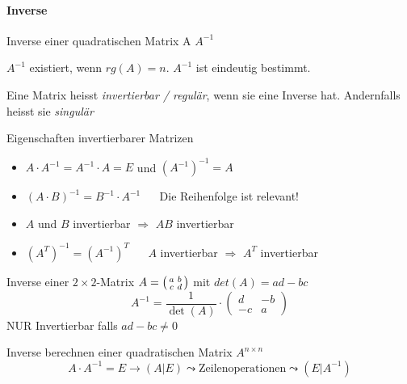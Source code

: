 \paragraph{Inverse}
    \begin{definition}{Inverse einer quadratischen Matrix A} $A^{-1}$ 
        
        $A^{-1}$ existiert, wenn $rg(A) = n$. $A^{-1}$ ist eindeutig bestimmt.

        \vspace{1mm}

        {\small Eine Matrix heisst \textit{invertierbar / regulär}, wenn sie eine Inverse hat. 
        Andernfalls heisst sie \textit{singulär}}
    \end{definition}
  
    \begin{theorem}{Eigenschaften invertierbarer Matrizen}
        \begin{itemize}
            \item $A\cdot A^{-1}=A^{-1}\cdot A=E$ und $(A^{-1})^{-1}=A$
            \item ${(A\cdot B)}^{-1}=B^{-1}\cdot A^{-1}$ {\small $\quad$ Die Reihenfolge ist relevant!}
            \item $A$ und $B$ invertierbar $\Rightarrow$ $AB$ invertierbar
            \item ${(A^T)^{-1}}={(A^{-1})}^T$ $\quad$ $A$ invertierbar $\Rightarrow$ $A^T$ invertierbar
        \end{itemize}
    \end{theorem}

\begin{theorem}{Inverse einer $2 \times 2$-Matrix} $A = \begin{psmallmatrix} a & b \\ c & d \end{psmallmatrix}$ mit $det(A) = ad - bc$
        $$A^{-1} = \frac{1}{\det(A)} \cdot \begin{pmatrix} d & -b \\ -c & a \end{pmatrix}$$
        NUR Invertierbar falls $ad - bc \neq 0$
\end{theorem}

\begin{KR}{Inverse berechnen} einer quadratischen Matrix $A^{n \times n}$
    $$A \cdot A^{-1} = E \rightarrow ( A | E ) \leadsto \text{Zeilenoperationen} \leadsto ( E | A^{-1})$$
\end{KR}

